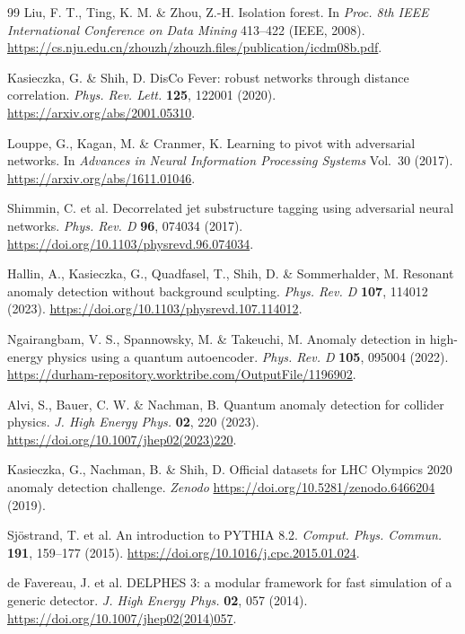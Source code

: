 \documentclass[11pt,a4paper]{article}
\begin{document}
\begin{thebibliography}{99}
 Liu, F. T., Ting, K. M. \& Zhou, Z.-H. Isolation forest. In \textit{Proc. 8th IEEE International Conference on Data Mining} 413--422 (IEEE, 2008). \url{https://cs.nju.edu.cn/zhouzh/zhouzh.files/publication/icdm08b.pdf}.

 Kasieczka, G. \& Shih, D. DisCo Fever: robust networks through distance correlation. \textit{Phys. Rev. Lett.} \textbf{125}, 122001 (2020). \url{https://arxiv.org/abs/2001.05310}.

 Louppe, G., Kagan, M. \& Cranmer, K. Learning to pivot with adversarial networks. In \textit{Advances in Neural Information Processing Systems} Vol.~30 (2017). \url{https://arxiv.org/abs/1611.01046}.

 Shimmin, C. et al. Decorrelated jet substructure tagging using adversarial neural networks. \textit{Phys. Rev. D} \textbf{96}, 074034 (2017). \url{https://doi.org/10.1103/physrevd.96.074034}.

 Hallin, A., Kasieczka, G., Quadfasel, T., Shih, D. \& Sommerhalder, M. Resonant anomaly detection without background sculpting. \textit{Phys. Rev. D} \textbf{107}, 114012 (2023). \url{https://doi.org/10.1103/physrevd.107.114012}.

 Ngairangbam, V. S., Spannowsky, M. \& Takeuchi, M. Anomaly detection in high-energy physics using a quantum autoencoder. \textit{Phys. Rev. D} \textbf{105}, 095004 (2022). \url{https://durham-repository.worktribe.com/OutputFile/1196902}.

 Alvi, S., Bauer, C. W. \& Nachman, B. Quantum anomaly detection for collider physics. \textit{J. High Energy Phys.} \textbf{02}, 220 (2023). \url{https://doi.org/10.1007/jhep02(2023)220}.

 Kasieczka, G., Nachman, B. \& Shih, D. Official datasets for LHC Olympics 2020 anomaly detection challenge. \textit{Zenodo} \url{https://doi.org/10.5281/zenodo.6466204} (2019).

 Sj\"ostrand, T. et al. An introduction to PYTHIA 8.2. \textit{Comput. Phys. Commun.} \textbf{191}, 159--177 (2015). \url{https://doi.org/10.1016/j.cpc.2015.01.024}.

 de Favereau, J. et al. DELPHES 3: a modular framework for fast simulation of a generic detector. \textit{J. High Energy Phys.} \textbf{02}, 057 (2014). \url{https://doi.org/10.1007/jhep02(2014)057}.


\end{thebibliography}
\end{document}

